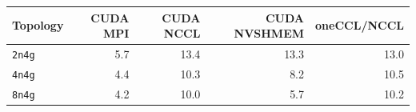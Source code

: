 \begin{tabular}{lrrrr}
\toprule
Topology & CUDA MPI & CUDA NCCL & CUDA NVSHMEM & oneCCL/NCCL\\
\midrule
\texttt{2n4g} & 5.7 & 13.4 & 13.3 & 13.0\\
\texttt{4n4g} & 4.4 & 10.3 & 8.2 & 10.5\\
\texttt{8n4g} & 4.2 & 10.0 & 5.7 & 10.2\\
\bottomrule
\end{tabular}
